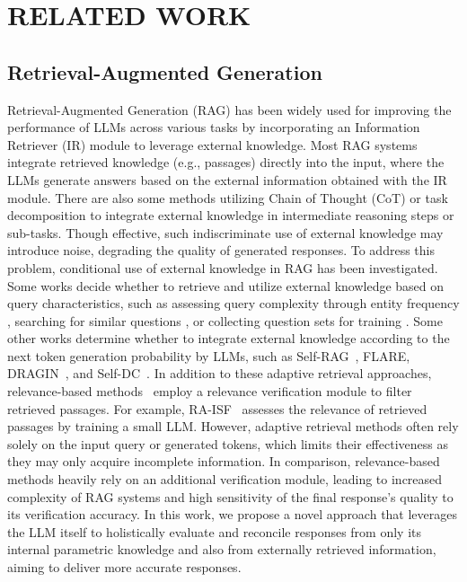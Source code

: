 \section{RELATED WORK}

\subsection{Retrieval-Augmented Generation}
Retrieval-Augmented Generation (RAG) \cite{Lewis2020RAG,Guu2020REALM} has been widely used for improving the performance of LLMs across various tasks by incorporating an Information Retriever (IR) module to leverage external knowledge. 
Most RAG systems~\cite{Lewis2020RAG,ram2023context,Izacard2023Atlas} integrate retrieved knowledge (e.g., passages) directly into the input, where the LLMs generate answers based on the external information obtained with the IR module.
There are also some methods utilizing Chain of Thought (CoT) \cite{wei2022cot, trivedi2023interleaving} or task decomposition \cite{Xu2024Search, wang2024selfdc, kim2024sure} to integrate external knowledge in intermediate reasoning steps or sub-tasks. 
Though effective, such indiscriminate use of external knowledge may introduce noise, degrading the quality of generated responses.
To address this problem, conditional use of external knowledge in RAG has been investigated.
Some works decide whether to retrieve and utilize external knowledge based on query characteristics, such as assessing query complexity through entity frequency \cite{mallen2023trust}, searching for similar questions \cite{wang2023skr}, or collecting question sets for training \cite{jeong2024adaptive}.
Some other works determine whether to integrate external knowledge according to the next token generation probability by LLMs, 
such as Self-RAG~\cite{asai2024selfrag}, FLARE\cite{jiang2023active}, DRAGIN~\cite{su2024dragin}, and Self-DC~\cite{wang2024selfdc}. 
In addition to these adaptive retrieval approaches, relevance-based methods~\cite{zhang2023merging,Xu2024Search,liu2024raisf} employ a relevance verification module to filter retrieved passages. 
For example, RA-ISF~\cite{liu2024raisf} assesses the relevance of retrieved passages by training a small LLM.
However, adaptive retrieval methods often rely solely on the input query or generated tokens, which limits their effectiveness as they may only acquire incomplete information. 
In comparison, relevance-based methods heavily rely on an additional verification module, leading to increased complexity of RAG systems and high sensitivity of the final response's quality to its verification accuracy. 
In this work, we propose a novel approach that leverages the LLM itself to holistically evaluate and reconcile responses from only its internal parametric knowledge and also from externally retrieved information, aiming to deliver more accurate responses.



